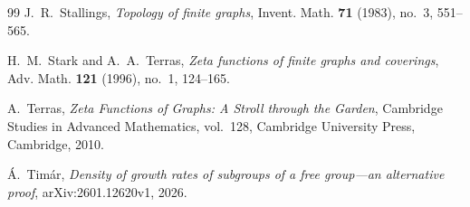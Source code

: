 \documentclass[11pt]{amsart}
\theoremstyle{plain}
\theoremstyle{definition}
\theoremstyle{remark}
\begin{document}
\begin{thebibliography}{99}
J.~R.~Stallings,
\emph{Topology of finite graphs},
Invent. Math. \textbf{71} (1983), no.~3, 551--565.

H.~M.~Stark and A.~A.~Terras,
\emph{Zeta functions of finite graphs and coverings},
Adv. Math. \textbf{121} (1996), no.~1, 124--165.

A.~Terras,
\emph{Zeta Functions of Graphs: A Stroll through the Garden},
Cambridge Studies in Advanced Mathematics, vol.~128,
Cambridge University Press, Cambridge, 2010.

\'A.~Tim\'ar,
\emph{Density of growth rates of subgroups of a free group---an alternative
proof},
arXiv:2601.12620v1, 2026.

\end{thebibliography}
\end{document}
